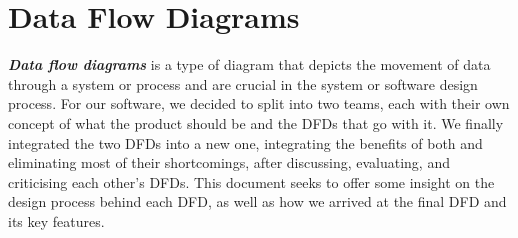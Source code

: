 \documentclass[english,a4paper,12pt]{report}
\begin{document}
\section*{Data Flow Diagrams}
\hspace{1cm} \textbf{\textit{Data flow diagrams}} is a type of diagram that depicts the movement of data through a system or process and are crucial in the system or software design process. For our software, we decided to split into two teams, each with their own concept of what the product should be and the DFDs that go with it. We finally integrated the two DFDs into a new one, integrating the benefits of both and eliminating most of their shortcomings, after discussing, evaluating, and criticising each other's DFDs. This document seeks to offer some insight on the design process behind each DFD, as well as how we arrived at the final DFD and its key features.
\end{document}
